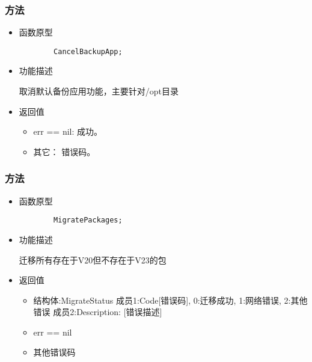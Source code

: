 \documentclass{utart}
\begin{document}
\subsubsection{方法}
\begin{itemize}
    \item 函数原型
    
    \begin{verbatim}
        CancelBackupApp;
      \end{verbatim}
    \item 功能描述
    
    取消默认备份应用功能，主要针对/opt目录
    \item 返回值
      \begin{itemize}
          \item err == nil: 成功。
          \item 其它： 错误码。
      \end{itemize}
\end{itemize}

\subsubsection{方法}
\begin{itemize}
    \item 函数原型
    
    \begin{verbatim}
        MigratePackages;
      \end{verbatim}
    \item 功能描述
    
    迁移所有存在于V20但不存在于V23的包
    \item 返回值
      \begin{itemize}
          \item 结构体:MigrateStatus 成员1:Code[错误码], 0:迁移成功, 1:网络错误, 2:其他错误   成员2:Description: [错误描述]
          \item err == nil
          \item 其他错误码
      \end{itemize}
\end{itemize}
\end{document}
